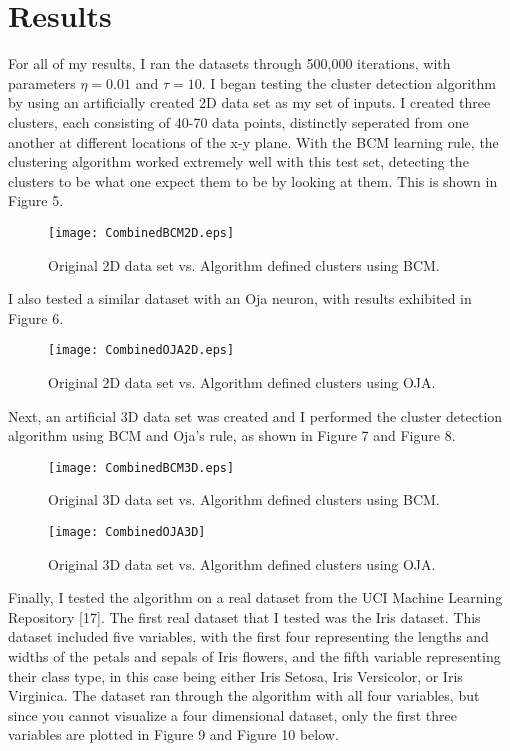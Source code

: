 \documentclass[10pt,twoside]{article}
\begin{document}
\section*{\centering Results}

For all of my results, I ran the datasets through 500,000 iterations, with parameters $\eta = 0.01$ and $\tau = 10$. 
I began testing the cluster detection algorithm by using an artificially created 2D data set as my set of inputs. 
I created three clusters, each consisting of 40-70 data points, distinctly seperated from one another at 
different locations of the x-y plane. With the BCM learning rule, the clustering algorithm worked extremely well with this test set, 
detecting the clusters to be what one expect them to be by looking at them. This is shown in Figure 5.

\begin{figure}[H]\small\centering\label{fig5}
\texttt{[image: CombinedBCM2D.eps]}
\caption{Original 2D data set vs. Algorithm defined clusters using BCM.}
\end{figure}

I also tested a similar dataset with an Oja neuron, with results exhibited in Figure 6. 

\begin{figure}[H]\small\centering\label{fig6}
\texttt{[image: CombinedOJA2D.eps]}
\caption{Original 2D data set vs. Algorithm defined clusters using OJA.}
\end{figure}

Next, an artificial 3D data set was created and I performed the cluster detection algorithm using BCM and Oja's rule, as shown in Figure 7 and Figure 8.

\begin{figure}[H]\small\centering\label{fig7}
\texttt{[image: CombinedBCM3D.eps]}
\caption{Original 3D data set vs. Algorithm defined clusters using BCM.}
\end{figure}

\begin{figure}[H]\small\centering\label{fig8}
\texttt{[image: CombinedOJA3D]}
\caption{Original 3D data set vs. Algorithm defined clusters using OJA.}
\end{figure}

Finally, I tested the algorithm on a real dataset from the UCI Machine Learning Repository [17]. The first real dataset that I tested was
the Iris dataset. This dataset included five variables, with the first four representing the lengths and widths of the petals and sepals of Iris flowers,
and the fifth variable representing their class type, in this case being either Iris Setosa, Iris Versicolor, or Iris Virginica. The dataset ran through the algorithm
with all four variables, but since you cannot visualize a four dimensional dataset, only the first three variables are plotted in Figure 9 and Figure 10 below.
\end{document}

